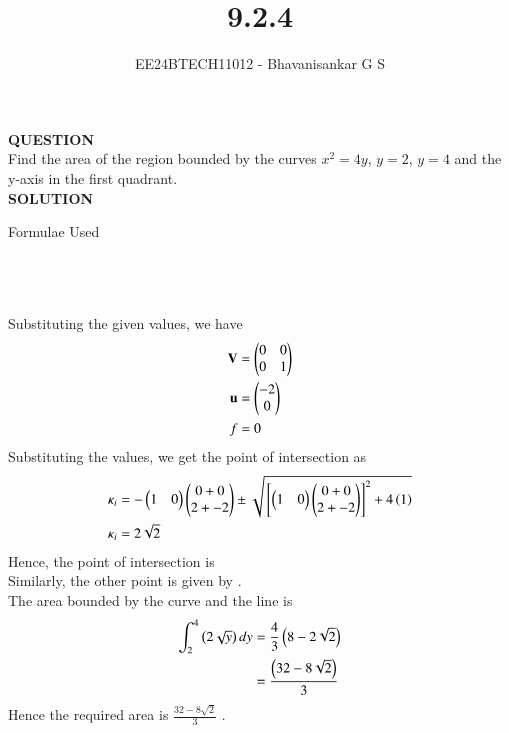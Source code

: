 \documentclass[journal]{IEEEtran}
\begin{document}

\vspace{3cm}

\title{9.2.4}
\author{EE24BTECH11012 - Bhavanisankar G S}
{\let\newpage\relax\maketitle}

\renewcommand{\thefigure}{\theenumi}
\renewcommand{\thetable}{\theenumi}
\setlength{\intextsep}{10pt} %


\renewcommand{\thetable}{\theenumi}

\textbf{QUESTION} \\
Find the area of the region bounded by the curves $ x^2 = 4y $, $ y=2$, $y=4$ and the y-axis in the first quadrant. \\
\textbf{SOLUTION} \\

\begin{table}[h!]
	\centering
        
	\caption{Formulae Used}
	\label{tab9.2.4}
\end{table} \\ \\ \\
Substituting the given values, we have \\
\begin{align}
	\mathbf{V} &= \begin{pmatrix} 0 & 0 \\ 0 & 1 \end{pmatrix} \\
	\mathbf{u} &= \begin{pmatrix} -2 \\ 0 \end{pmatrix} \\
	f &= 0 \\
\end{align}
Substituting the values, we get the point of intersection as \\
\begin{align}
	\kappa_i &= -\begin{pmatrix}1&0\end{pmatrix}\begin{pmatrix}0 + 0 \\ 2 + -2\end{pmatrix} \pm \sqrt{{}\left[\begin{pmatrix}1&0\end{pmatrix}\begin{pmatrix}0+0\\ 2+-2\end{pmatrix} \right]^2 + 4\left(1\right)} \\
	\kappa_i &= 2\sqrt{2} \\
\end{align}
Hence, the point of intersection is  \\
Similarly, the other point is given by  .\\
The area bounded by the curve and the line is \\
\begin{align}
	\int_{2}^{4} \left(2\sqrt{y}\right) dy &= \frac{4}{3}\left(8-2\sqrt{2}\right) \\
	&= \frac{\left(32 - 8\sqrt{2}\right)}{3} \\
\end{align}
Hence the required area is $\frac{32-8\sqrt{2}}{3}$ .
	
\end{document}
